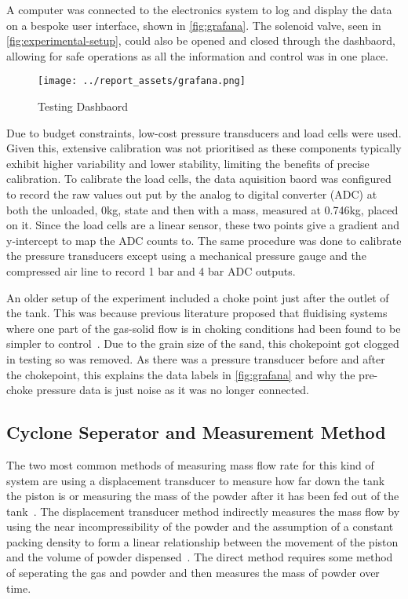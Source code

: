 A computer was connected to the electronics system to log and display the data on a bespoke user interface, shown in \autoref{fig:grafana}. The solenoid valve, seen in \autoref{fig:experimental-setup}, could also be opened and closed through the dashbaord, allowing for safe operations as all the information and control was in one place.
\begin{figure}[htbp]
    \centering

    \begin{minipage}{0.95\textwidth}
        \centering
        \texttt{[image: ../report\_assets/grafana.png]}
        \caption{Testing Dashbaord}\label{fig:grafana}
    \end{minipage}

\end{figure}
Due to budget constraints, low-cost pressure transducers and load cells were used. Given this, extensive calibration was not prioritised as these components typically exhibit higher variability and lower stability, limiting the benefits of precise calibration. To calibrate the load cells, the data aquisition baord was configured to record the raw values out put by the analog to digital converter (ADC) at both the unloaded, 0kg, state and then with a mass, measured at 0.746kg, placed on it. Since the load cells are a linear sensor, these two points give a gradient and y-intercept to map the ADC counts to. The same procedure was done to calibrate the pressure transducers except using a mechanical pressure gauge and the compressed air line to record 1 bar and 4 bar ADC outputs.

An older setup of the experiment included a choke point just after the outlet of the tank. This was because previous literature proposed that fluidising systems where one part of the gas-solid flow is in choking conditions had been found to be simpler to control~\cite{SUN201630}. Due to the grain size of the sand, this chokepoint got clogged in testing so was removed. As there was a pressure transducer before and after the chokepoint, this explains the data labels in \autoref{fig:grafana} and why the pre-choke pressure data is just noise as it was no longer connected.

\subsection{Cyclone Seperator and Measurement Method}
The two most common methods of measuring mass flow rate for this kind of system are using a displacement transducer to measure how far down the tank the piston is or measuring the mass of the powder after it has been fed out of the tank~\cite{SUN201630}\cite{LI2021712}\cite{Tang22}. The displacement transducer method indirectly measures the mass flow by using the near incompressibility of the powder and the assumption of a constant packing density to form a linear relationship between the movement of the piston and the volume of powder dispensed~\cite{SUN201630}. The direct method requires some method of seperating the gas and powder and then measures the mass of powder over time. 

